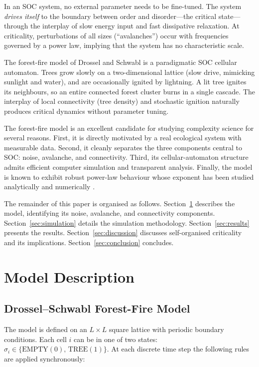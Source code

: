 \documentclass[12pt,a4paper]{article}
\begin{document}
In an SOC system, no external parameter needs to be fine-tuned.
The system \emph{drives itself} to the boundary between order and disorder---the
critical state---through the interplay of slow energy input and fast
dissipative relaxation.
At criticality, perturbations of all sizes (``avalanches'') occur with
frequencies governed by a power law, implying that the system has no
characteristic scale.

The forest-fire model of Drossel and Schwabl \cite{Drossel1992} is a paradigmatic
SOC cellular automaton.
Trees grow slowly on a two-dimensional lattice (slow drive, mimicking sunlight
and water), and are occasionally ignited by lightning.
A lit tree ignites its neighbours, so an entire connected forest cluster
burns in a single cascade.
The interplay of local connectivity (tree density) and stochastic ignition
naturally produces critical dynamics without parameter tuning.

The forest-fire model is an excellent candidate for studying complexity science
for several reasons.
First, it is directly motivated by a real ecological system with measurable
data.
Second, it cleanly separates the three components central to SOC: noise,
avalanche, and connectivity.
Third, its cellular-automaton structure admits efficient computer simulation
and transparent analysis.
Finally, the model is known to exhibit robust power-law behaviour whose
exponent has been studied analytically and numerically \cite{Christensen1993,Pruessner2004}.

The remainder of this paper is organised as follows.
Section~\ref{sec:model} describes the model, identifying its noise, avalanche,
and connectivity components.
Section~\ref{sec:simulation} details the simulation methodology.
Section~\ref{sec:results} presents the results.
Section~\ref{sec:discussion} discusses self-organised criticality and its
implications.
Section~\ref{sec:conclusion} concludes.

\clearpage
\section{Model Description}
\label{sec:model}

\subsection{Drossel--Schwabl Forest-Fire Model}

The model is defined on an $L\times L$ square lattice with periodic boundary
conditions.
Each cell $i$ can be in one of two states:
$\sigma_i \in \{\text{EMPTY}(0),\,\text{TREE}(1)\}$.
At each discrete time step the following rules are applied synchronously:
\end{document}
